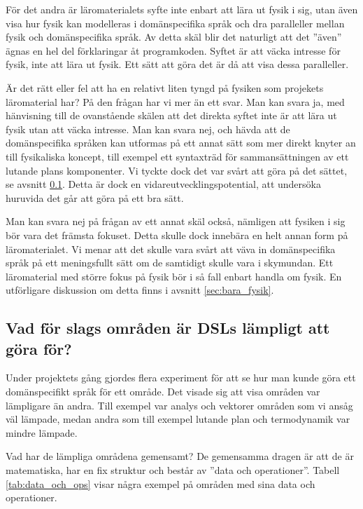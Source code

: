 \begin{binge}
För det andra är läromaterialets syfte inte enbart att lära ut fysik i sig,
utan även visa hur fysik kan modelleras i domänspecifika språk och dra
paralleller mellan fysik och domänspecifika språk. Av detta skäl blir det
naturligt att det ''även'' ägnas en hel del förklaringar åt programkoden.
Syftet är att väcka intresse för fysik, inte att lära ut fysik. Ett sätt att
göra det är då att visa dessa paralleller.

Är det rätt eller fel att ha en relativt liten tyngd på fysiken som projekets
läromaterial har? På den frågan har vi mer än ett svar. Man kan svara ja, med
hänvisning till de ovanstående skälen att det direkta syftet inte är att lära
ut fysik utan att väcka intresse. Man kan svara nej, och hävda att de
domänspecifika språken kan utformas på ett annat sätt som mer direkt
knyter an till fysikaliska koncept, till exempel ett syntaxträd för
sammansättningen av ett lutande plans komponenter. Vi tyckte dock det var svårt
att göra på det sättet, se avsnitt \ref{sec:lampligt}. Detta är dock en
vidareutvecklingspotential, att undersöka huruvida det går att göra på ett bra
sätt.

Man kan svara nej på frågan av ett annat skäl också, nämligen att fysiken i sig
bör vara det främsta fokuset. Detta skulle dock innebära en helt annan form på
läromaterialet. Vi menar att det skulle vara svårt att väva in domänspecifika
språk på ett meningsfullt sätt om de samtidigt skulle vara i skymundan. Ett
läromaterial med större fokus på fysik bör i så fall enbart handla om fysik. En
utförligare diskussion om detta finns i avsnitt \ref{sec:bara_fysik}.

\subsection{Vad för slags områden är DSLs lämpligt att göra för?}
\label{sec:lampligt}

Under projektets gång gjordes flera experiment för att se hur man kunde göra ett domänspecifikt språk för ett område. Det visade sig att visa områden var lämpligare än andra. Till exempel var analys och vektorer områden som vi ansåg väl lämpade, medan andra som till exempel lutande plan och termodynamik var mindre lämpade.

Vad har de lämpliga områdena gemensamt? De gemensamma dragen är att de är matematiska, har en fix struktur och består av ''data och operationer''. Tabell \ref{tab:data_och_ops} visar några exempel på områden med sina data och operationer.


\end{binge}
